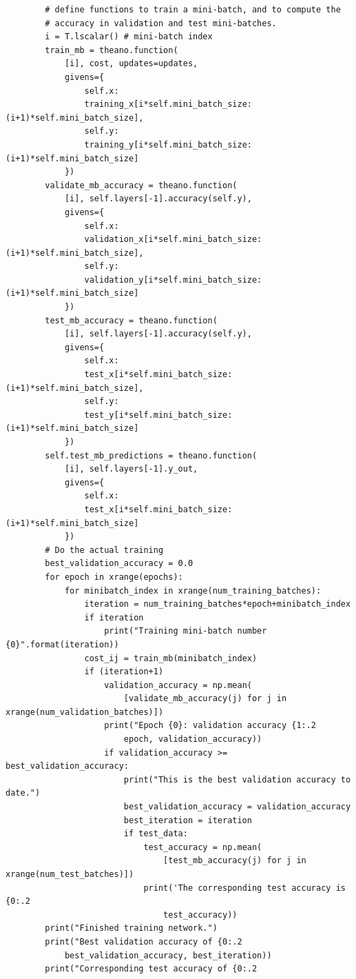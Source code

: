 \begin{lstlisting}
        # define functions to train a mini-batch, and to compute the
        # accuracy in validation and test mini-batches.
        i = T.lscalar() # mini-batch index
        train_mb = theano.function(
            [i], cost, updates=updates,
            givens={
                self.x:
                training_x[i*self.mini_batch_size: (i+1)*self.mini_batch_size],
                self.y:
                training_y[i*self.mini_batch_size: (i+1)*self.mini_batch_size]
            })
        validate_mb_accuracy = theano.function(
            [i], self.layers[-1].accuracy(self.y),
            givens={
                self.x:
                validation_x[i*self.mini_batch_size: (i+1)*self.mini_batch_size],
                self.y:
                validation_y[i*self.mini_batch_size: (i+1)*self.mini_batch_size]
            })
        test_mb_accuracy = theano.function(
            [i], self.layers[-1].accuracy(self.y),
            givens={
                self.x:
                test_x[i*self.mini_batch_size: (i+1)*self.mini_batch_size],
                self.y:
                test_y[i*self.mini_batch_size: (i+1)*self.mini_batch_size]
            })
        self.test_mb_predictions = theano.function(
            [i], self.layers[-1].y_out,
            givens={
                self.x:
                test_x[i*self.mini_batch_size: (i+1)*self.mini_batch_size]
            })
        # Do the actual training
        best_validation_accuracy = 0.0
        for epoch in xrange(epochs):
            for minibatch_index in xrange(num_training_batches):
                iteration = num_training_batches*epoch+minibatch_index
                if iteration
                    print("Training mini-batch number {0}".format(iteration))
                cost_ij = train_mb(minibatch_index)
                if (iteration+1)
                    validation_accuracy = np.mean(
                        [validate_mb_accuracy(j) for j in xrange(num_validation_batches)])
                    print("Epoch {0}: validation accuracy {1:.2
                        epoch, validation_accuracy))
                    if validation_accuracy >= best_validation_accuracy:
                        print("This is the best validation accuracy to date.")
                        best_validation_accuracy = validation_accuracy
                        best_iteration = iteration
                        if test_data:
                            test_accuracy = np.mean(
                                [test_mb_accuracy(j) for j in xrange(num_test_batches)])
                            print('The corresponding test accuracy is {0:.2
                                test_accuracy))
        print("Finished training network.")
        print("Best validation accuracy of {0:.2
            best_validation_accuracy, best_iteration))
        print("Corresponding test accuracy of {0:.2

\end{lstlisting}

